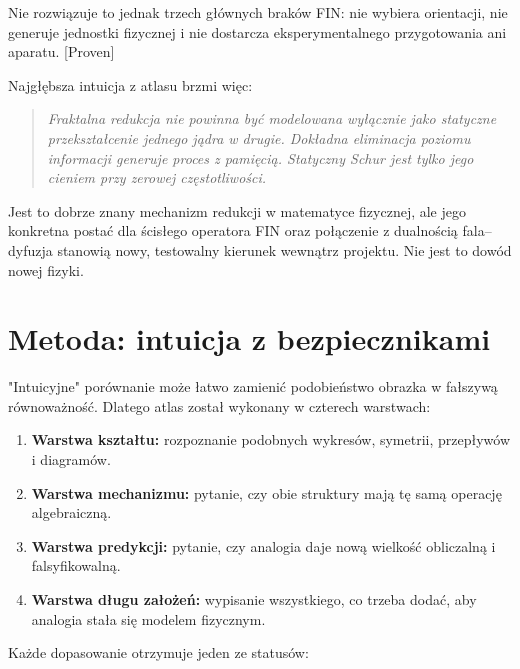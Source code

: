 \documentclass[11pt,a4paper,openany]{report}
\newcommand{\statusProven}{\textcolor{fingreen}{[Proven]}}
\begin{document}
Nie rozwiązuje to jednak trzech głównych braków FIN: nie wybiera orientacji, nie generuje jednostki fizycznej i nie dostarcza eksperymentalnego przygotowania ani aparatu. \statusProven{}

Najgłębsza intuicja z atlasu brzmi więc:

\begin{quote}\itshape
Fraktalna redukcja nie powinna być modelowana wyłącznie jako statyczne przekształcenie jednego jądra w drugie. Dokładna eliminacja poziomu informacji generuje proces z pamięcią. Statyczny Schur jest tylko jego cieniem przy zerowej częstotliwości.

\end{quote}

Jest to dobrze znany mechanizm redukcji w matematyce fizycznej, ale jego konkretna postać dla ścisłego operatora FIN oraz połączenie z dualnością fala--dyfuzja stanowią nowy, testowalny kierunek wewnątrz projektu. Nie jest to dowód nowej fizyki.

\chapter{Metoda: intuicja z bezpiecznikami}

"Intuicyjne" porównanie mo\.ze łatwo zamienić podobieństwo obrazka w fałszywą równowa\.zność. Dlatego atlas został wykonany w czterech warstwach:

\begin{enumerate}
\item 
\textbf{Warstwa kształtu:} rozpoznanie podobnych wykresów, symetrii, przepływów i diagramów.

\item 
\textbf{Warstwa mechanizmu:} pytanie, czy obie struktury mają tę samą operację algebraiczną.

\item 
\textbf{Warstwa predykcji:} pytanie, czy analogia daje nową wielkość obliczalną i falsyfikowalną.

\item 
\textbf{Warstwa długu zało\.zeń:} wypisanie wszystkiego, co trzeba dodać, aby analogia stała się modelem fizycznym.

\end{enumerate}

Ka\.zde dopasowanie otrzymuje jeden ze statusów:
\end{document}
